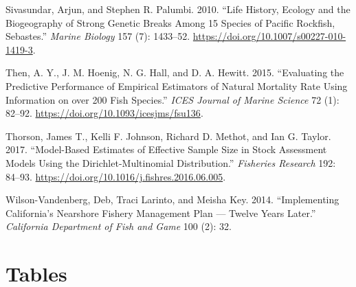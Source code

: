 \documentclass[11pt,
  english,
  a4paper,
]{article}
\begin{document}
\begin{cslreferences}
\leavevmode\hypertarget{ref-sivasundar_life_2010}{}%
Sivasundar, Arjun, and Stephen R. Palumbi. 2010. ``Life History, Ecology and the Biogeography of Strong Genetic Breaks Among 15 Species of Pacific Rockfish, Sebastes.'' \emph{Marine Biology} 157 (7): 1433--52. \url{https://doi.org/10.1007/s00227-010-1419-3}.

\leavevmode\hypertarget{ref-then_evaluating_2015}{}%
Then, A. Y., J. M. Hoenig, N. G. Hall, and D. A. Hewitt. 2015. ``Evaluating the Predictive Performance of Empirical Estimators of Natural Mortality Rate Using Information on over 200 Fish Species.'' \emph{ICES Journal of Marine Science} 72 (1): 82--92. \url{https://doi.org/10.1093/icesjms/fsu136}.

\leavevmode\hypertarget{ref-thorson_model-based_2017}{}%
Thorson, James T., Kelli F. Johnson, Richard D. Methot, and Ian G. Taylor. 2017. ``Model-Based Estimates of Effective Sample Size in Stock Assessment Models Using the Dirichlet-Multinomial Distribution.'' \emph{Fisheries Research} 192: 84--93. \url{https://doi.org/10.1016/j.fishres.2016.06.005}.

\leavevmode\hypertarget{ref-wilson-vandenberg_implementing_2014}{}%
Wilson-Vandenberg, Deb, Traci Larinto, and Meisha Key. 2014. ``Implementing California's Nearshore Fishery Management Plan --- Twelve Years Later.'' \emph{California Department of Fish and Game} 100 (2): 32.
\end{cslreferences}

\leavevmode\tagmcend\tagstructend

\clearpage


\hypertarget{tables}{%
\section{Tables}\label{tables}}

\leavevmode\tagmcend\tagstructend



\newpage

\begingroup\fontsize{10}{12}\selectfont
\end{document}

